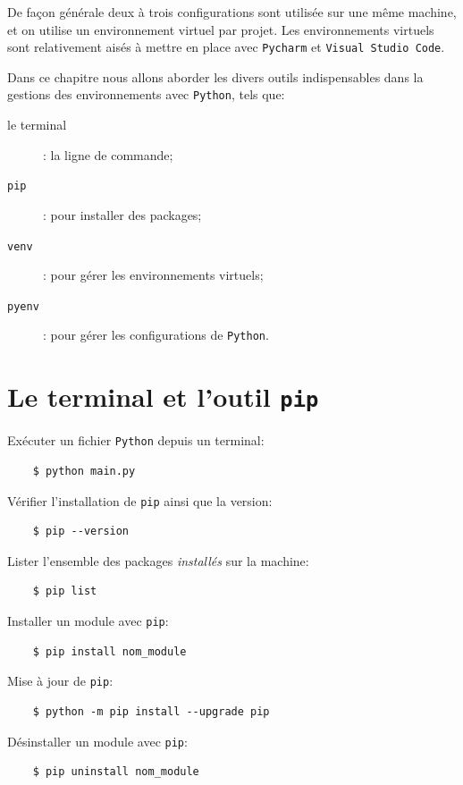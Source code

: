 \documentclass[a4paper,12pt]{book}
\begin{document}
De façon générale deux à trois configurations sont utilisée sur une même machine, et  on utilise  un environnement virtuel par projet. Les environnements virtuels sont relativement aisés à mettre en place  avec \texttt{Pycharm} et \texttt{Visual Studio Code}.
\medskip

Dans ce chapitre nous allons aborder les divers outils indispensables dans la gestions des environnements avec \texttt{Python}, tels que:
\begin{description}
	\item[le terminal]: la ligne de commande;
	\item[\texttt{pip}]: pour installer des packages;
	\item[\texttt{venv}]: pour gérer les environnements virtuels;
	\item[\texttt{pyenv}]: pour gérer les configurations de \texttt{Python}.
\end{description}
\medskip

\section{Le terminal et l'outil \texttt{pip}}
Exécuter un fichier \texttt{Python} depuis un terminal:
\begin{verbatim}
    $ python main.py
\end{verbatim} 
\medskip

Vérifier l'installation de \texttt{pip} ainsi que la version:
\begin{verbatim}
    $ pip --version
\end{verbatim}
\medskip

Lister l'ensemble des packages \textit{installés} sur la machine:
\begin{verbatim}
    $ pip list
\end{verbatim}
\medskip

Installer un module avec \texttt{pip}:
\begin{verbatim}
    $ pip install nom_module
\end{verbatim}
\medskip

Mise à jour de \texttt{pip}:
\begin{verbatim}
    $ python -m pip install --upgrade pip
\end{verbatim}
\medskip

Désinstaller un module avec \texttt{pip}:
\begin{verbatim}
    $ pip uninstall nom_module
\end{verbatim}
\medskip
\end{document}

